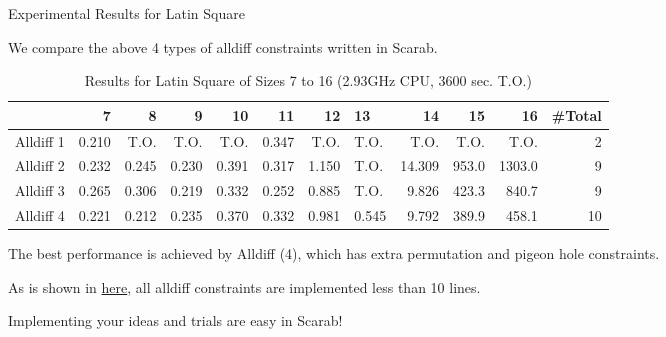 \documentclass[compress,dvipdfmx]{beamer}
\begin{document}
\begin{frame}[label=sec-3]{Experimental Results for Latin Square}
\begin{block}{We compare the above 4 types of alldiff constraints written in Scarab.}
\begin{table}[htb]
\caption{Results for Latin Square of Sizes 7 to 16 (2.93GHz CPU, 3600 sec. T.O.)}
\centering
\begin{tabular}{lrrrrrrlrrrr}
\hline
 & 7 & 8 & 9 & 10 & 11 & 12 & 13 & 14 & 15 & 16 & \#Total\\
\hline
Alldiff 1 & 0.210 & T.O. & T.O. & T.O. & 0.347 & T.O. & T.O. & T.O. & T.O. & T.O. & 2\\
Alldiff 2 & 0.232 & 0.245 & 0.230 & 0.391 & 0.317 & 1.150 & T.O. & 14.309 & 953.0 & 1303.0 & 9\\
Alldiff 3 & 0.265 & 0.306 & 0.219 & 0.332 & 0.252 & 0.885 & T.O. & 9.826 & 423.3 & 840.7 & 9\\
Alldiff 4 & 0.221 & 0.212 & 0.235 & 0.370 & 0.332 & 0.981 & 0.545 & 9.792 & 389.9 & 458.1 & \alert{10}\\
\hline
\end{tabular}
\end{table}
\end{block}

\begin{block}{The best performance is achieved by Alldiff (4), which has extra permutation and pigeon hole constraints.}
\end{block}
\begin{block}{As is shown in \href{./examples.html}{here}, all alldiff constraints are implemented less than 10 lines.}
\end{block}
\begin{block}{\alert{Implementing your ideas and trials are easy in Scarab!}}
\end{block}
\end{frame}
\end{document}
